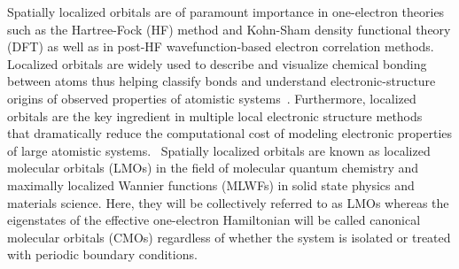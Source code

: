 \documentclass[aps,prl,reprint,amsmath,amssymb]{revtex4-1}
\begin{document}

Spatially localized orbitals are of paramount importance in one-electron theories such as the Hartree-Fock (HF) method and Kohn-Sham density functional theory (DFT) as well as in post-HF wavefunction-based electron correlation methods.
Localized orbitals are widely used to describe and visualize chemical bonding between atoms thus helping classify bonds and understand electronic-structure origins of observed properties of atomistic systems~\cite{RZK}. 
Furthermore, localized orbitals are the key ingredient in multiple local electronic structure methods~\cite{goedecker1994efficient, bowler2012methods, zalesny2011linear, pulay1986orbital, saebo2001low, pisani2005local, hampel1996local, forner1997numerical} that dramatically reduce the computational cost of modeling electronic properties of large atomistic systems.~\cite{saebo1993local, schutz1999low, hetzer2000low, schutz2001low}
Spatially localized orbitals are known as localized molecular orbitals (LMOs) in the field of molecular quantum chemistry and maximally localized Wannier functions (MLWFs) in solid state physics and materials science. 
Here, they will be collectively referred to as LMOs whereas the eigenstates of the effective one-electron Hamiltonian will be called canonical molecular orbitals (CMOs) regardless of whether the system is isolated or treated with periodic boundary conditions.

%
\end{document}
